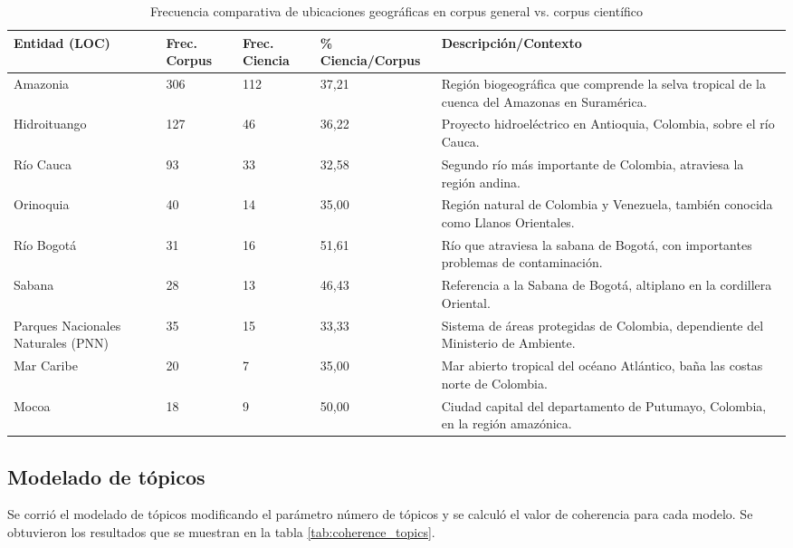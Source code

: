 \documentclass[11pt,a4paper]{article}
\begin{document}
	\begin{table}[H]
		\centering
		\caption{Frecuencia comparativa de ubicaciones geográficas en corpus general vs. corpus científico}
		\label{tab:ents_loc}
		\footnotesize 
		\begin{tabular}{p{3cm}P{2.2cm}P{2.2cm}P{2.2cm}p{5cm}}
			\toprule
			\textbf{Entidad (LOC)} & 
			\textbf{Frec. Corpus} & 
			\textbf{Frec. Ciencia} & 
			\textbf{\% Ciencia/Corpus} & 
			\textbf{Descripción/Contexto} \\
			\midrule
			Amazonia & 306 & 112 & 37,21 & Región biogeográfica que comprende la selva tropical de la cuenca del Amazonas en Suramérica. \\
			Hidroituango & 127 & 46 & 36,22 & Proyecto hidroeléctrico en Antioquia, Colombia, sobre el río Cauca. \\
			Río Cauca & 93 & 33 & 32,58 & Segundo río más importante de Colombia, atraviesa la región andina. \\
			Orinoquia & 40 & 14 & 35,00 & Región natural de Colombia y Venezuela, también conocida como Llanos Orientales. \\
			Río Bogotá & 31 & 16 & 51,61 & Río que atraviesa la sabana de Bogotá, con importantes problemas de contaminación. \\
			Sabana & 28 & 13 & 46,43 & Referencia a la Sabana de Bogotá, altiplano en la cordillera Oriental. \\
			Parques Nacionales Naturales (PNN) & 35 & 15 & 33,33 & Sistema de áreas protegidas de Colombia, dependiente del Ministerio de Ambiente. \\
			Mar Caribe & 20 & 7 & 35,00 & Mar abierto tropical del océano Atlántico, baña las costas norte de Colombia. \\
			Mocoa & 18 & 9 & 50,00 & Ciudad capital del departamento de Putumayo, Colombia, en la región amazónica. \\
			\bottomrule
		\end{tabular}
	\end{table}
	
	
	\subsection{Modelado de tópicos}
		Se corrió el modelado de tópicos modificando el parámetro número de tópicos y se calculó el valor de coherencia para cada modelo. Se obtuvieron los resultados que se muestran en la tabla \ref{tab:coherence_topics}. 
		
\end{document}
